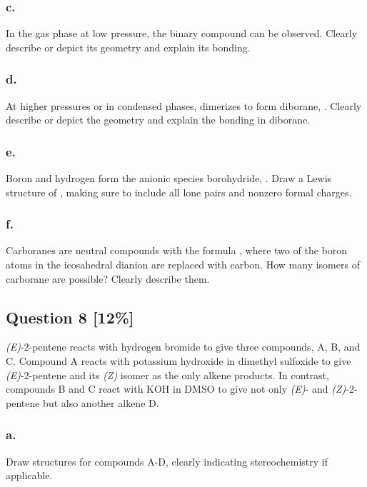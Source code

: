 \documentclass[11pt,letterpaper]{article}
\begin{document}
\subsubsection*{c.}
In the gas phase at low pressure, the binary compound  can be observed. Clearly describe or depict its geometry and explain its bonding.
\vspace{3cm}

\subsubsection*{d.}
At higher pressures or in condensed phases,  dimerizes to form diborane, . Clearly describe or depict the geometry and explain the bonding in diborane.
\vspace{3cm}

\subsubsection*{e.}
Boron and hydrogen form the anionic species borohydride, . Draw a Lewis structure of , making sure to include all lone pairs and nonzero formal charges.
\vspace{3cm}

\subsubsection*{f.}
Carboranes are neutral compounds with the formula , where two of the boron atoms in the icosahedral dianion  are replaced with carbon. How many isomers of carborane are possible? Clearly describe them.
\vspace{3cm}

\newpage
\subsection*{Question 8 [12\%]}
\textit{(E)}-2-pentene reacts with hydrogen bromide to give three compounds, A, B, and C. Compound A reacts with potassium hydroxide in dimethyl sulfoxide to give \textit{(E)}-2-pentene and its \textit{(Z)} isomer as the only alkene products. In contrast, compounds B and C react with KOH in DMSO to give not only \textit{(E)}- and \textit{(Z)}-2-pentene but also another alkene D.

\subsubsection*{a.}
Draw structures for compounds A-D, clearly indicating stereochemistry if applicable.
\vspace{5cm}
\end{document}
